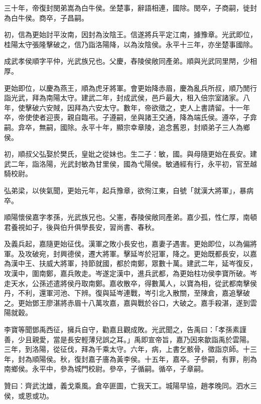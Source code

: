 \begin{pinyinscope}
三十年，帝復封閔弟嵩為白牛侯。坐楚事，辭語相連，國除。閔卒，子商嗣，徙封為白牛侯。商卒，子昌嗣。

初，信為更始討平汝南，因封為汝陰王。信遂將兵平定江南，據豫章。光武即位，桂陽太守張隆擊破之，信乃詣洛陽降，以為汝陰侯。永平十三年，亦坐楚事國除。

成武孝侯順字平仲，光武族兄也。父慶，舂陵侯敞同產弟。順與光武同里閈，少相厚。

更始即位，以慶為燕王，順為虎牙將軍。會更始降赤眉，慶為亂兵所叔，順乃閒行詣光武，拜為南陽太守。建武二年，封成武侯，邑戶最大，租入倍宗室諸家。八年，使擊破六安賊，因拜為六安太守。數年，帝欲徵之，吏人上書請留。十一年卒，帝使使者迎喪，親自臨弔。子遵嗣，坐與諸王交通，降為端氏侯。遵卒，子弇嗣。弇卒，無嗣，國除。永平十年，顯宗幸章陵，追念舊恩，封順弟子三人為鄉侯。

初，順叔父弘娶於樊氏，皇妣之從妹也。生二子：敏，國。與母隨更始在長安。建武二年，詣洛陽，光武封敏為甘里侯，國為弋陽侯。敏通經有行，永平初，官至越騎校尉。

弘弟梁，以俠氣聞，更始元年，起兵豫章，欲徇江東，自號「就漢大將軍」，暴病卒。

順陽懷侯嘉字孝孫，光武族兄也。父憲，舂陵侯敞同產弟。嘉少孤，性仁厚，南頓君養視如子，後與伯升俱學長安，習尚書、春秋。

及義兵起，嘉隨更始征伐。漢軍之敗小長安也，嘉妻子遇害。更始即位，以為偏將軍。及攻破宛，封興德侯，遷大將軍。擊延岑於冠軍，降之。更始既都長安，以嘉為漢中王、扶威大將軍，持節就國，都於南鄭，眾數十萬。建武二年，延岑復反，攻漢中，圍南鄭，嘉兵敗走。岑遂定漢中，進兵武都，為更始柱功侯李寶所破。岑走天水，公孫述遣將侯丹取南鄭。嘉收散卒，得數萬人，以寶為相，從武都南擊侯丹，不利，還軍河池、下辨。復與延岑連戰，岑引北入散關，至陳倉，嘉追擊破之。更始鄧王廖湛將赤眉十八萬攻嘉，嘉與戰於谷口，大破之。嘉手殺湛，遂到雲陽就穀。

李寶等聞鄧禹西征，擁兵自守，勸嘉且觀成敗。光武聞之，告禹曰：「孝孫素謹善，少且親愛，當是長安輕薄兒誤之耳。」禹即宣帝旨，嘉乃因來歙詣禹於雲陽。三年，到洛陽，從征伐，拜為千乘太守。六年，病，上書乞骸骨，徵詣京師。十三年，封為順陽侯。秋，復封嘉子廧為黃李侯。十五年，嘉卒。子參嗣，有罪，削為南鄉侯。永平中，參為城門校尉。參卒，子循嗣。循卒，子章嗣。

贊曰：齊武沈雄，義戈乘風。倉卒匪圖，亡我天工。城陽早協，趙孝晚同。泗水三侯，或恩或功。


\end{pinyinscope}